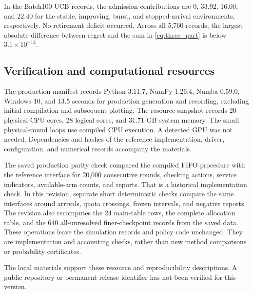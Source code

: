 In the Batch100-UCB records, the admission contributions are $0$, $33.92$,
$16.00$, and $22.40$ for the stable, improving, burst, and stopped-arrival
environments, respectively. No retirement deficit occurred. Across all
5,760 records, the largest absolute difference between regret and the
sum in \eqref{eq:three_part} is below $3.1\times10^{-12}$.

\subsection{Verification and computational resources}

The production manifest records Python 3.11.7, NumPy 1.26.4, Numba 0.59.0,
Windows 10, and 13.5 seconds for production generation and recording,
excluding initial compilation and subsequent plotting. The resource snapshot records
20 physical CPU cores, 28 logical cores, and 31.71 GB system memory.
The small physical-round loops use compiled CPU execution. A detected GPU
was not needed. Dependencies and hashes of the reference implementation,
driver, configuration, and numerical records accompany the materials.

The saved production parity check compared the compiled FIFO procedure
with the reference interface for 20,000 consecutive rounds, checking
actions, service indicators, available-arm counts, and reports. That is a
historical implementation check. In this revision, separate short
deterministic checks compare the same interfaces around arrivals, quota
crossings, frozen intervals, and negative reports. The revision also
recomputes the 24 main-table rows, the complete allocation table, and the
640 all-unresolved finer-checkpoint records from the saved data.
These operations leave the simulation records and policy code unchanged.
They are implementation and accounting checks, rather than new method
comparisons or probability certificates.

The local materials support these resource and reproducibility
descriptions. A public repository or permanent release identifier has not
been verified for this version.
